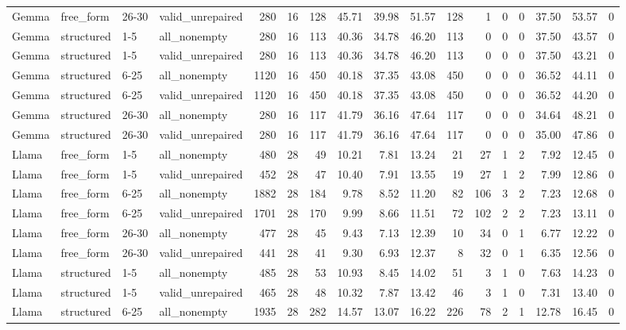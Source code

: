 \begin{longtable}{llllrrrrrrrrrrrrr}
Gemma & free\_form & 26-30 & valid\_unrepaired & 280 & 16 & 128 & 45.71 & 39.98 & 51.57 & 128 & 1 & 0 & 0 & 37.50 & 53.57 & 0 \\
Gemma & structured & 1-5 & all\_nonempty & 280 & 16 & 113 & 40.36 & 34.78 & 46.20 & 113 & 0 & 0 & 0 & 37.50 & 43.57 & 0 \\
Gemma & structured & 1-5 & valid\_unrepaired & 280 & 16 & 113 & 40.36 & 34.78 & 46.20 & 113 & 0 & 0 & 0 & 37.50 & 43.21 & 0 \\
Gemma & structured & 6-25 & all\_nonempty & 1120 & 16 & 450 & 40.18 & 37.35 & 43.08 & 450 & 0 & 0 & 0 & 36.52 & 44.11 & 0 \\
Gemma & structured & 6-25 & valid\_unrepaired & 1120 & 16 & 450 & 40.18 & 37.35 & 43.08 & 450 & 0 & 0 & 0 & 36.52 & 44.20 & 0 \\
Gemma & structured & 26-30 & all\_nonempty & 280 & 16 & 117 & 41.79 & 36.16 & 47.64 & 117 & 0 & 0 & 0 & 34.64 & 48.21 & 0 \\
Gemma & structured & 26-30 & valid\_unrepaired & 280 & 16 & 117 & 41.79 & 36.16 & 47.64 & 117 & 0 & 0 & 0 & 35.00 & 47.86 & 0 \\
Llama & free\_form & 1-5 & all\_nonempty & 480 & 28 & 49 & 10.21 & 7.81 & 13.24 & 21 & 27 & 1 & 2 & 7.92 & 12.45 & 0 \\
Llama & free\_form & 1-5 & valid\_unrepaired & 452 & 28 & 47 & 10.40 & 7.91 & 13.55 & 19 & 27 & 1 & 2 & 7.99 & 12.86 & 0 \\
Llama & free\_form & 6-25 & all\_nonempty & 1882 & 28 & 184 & 9.78 & 8.52 & 11.20 & 82 & 106 & 3 & 2 & 7.23 & 12.68 & 0 \\
Llama & free\_form & 6-25 & valid\_unrepaired & 1701 & 28 & 170 & 9.99 & 8.66 & 11.51 & 72 & 102 & 2 & 2 & 7.23 & 13.11 & 0 \\
Llama & free\_form & 26-30 & all\_nonempty & 477 & 28 & 45 & 9.43 & 7.13 & 12.39 & 10 & 34 & 0 & 1 & 6.77 & 12.22 & 0 \\
Llama & free\_form & 26-30 & valid\_unrepaired & 441 & 28 & 41 & 9.30 & 6.93 & 12.37 & 8 & 32 & 0 & 1 & 6.35 & 12.56 & 0 \\
Llama & structured & 1-5 & all\_nonempty & 485 & 28 & 53 & 10.93 & 8.45 & 14.02 & 51 & 3 & 1 & 0 & 7.63 & 14.23 & 0 \\
Llama & structured & 1-5 & valid\_unrepaired & 465 & 28 & 48 & 10.32 & 7.87 & 13.42 & 46 & 3 & 1 & 0 & 7.31 & 13.40 & 0 \\
Llama & structured & 6-25 & all\_nonempty & 1935 & 28 & 282 & 14.57 & 13.07 & 16.22 & 226 & 78 & 2 & 1 & 12.78 & 16.45 & 0 \\

\end{longtable}
